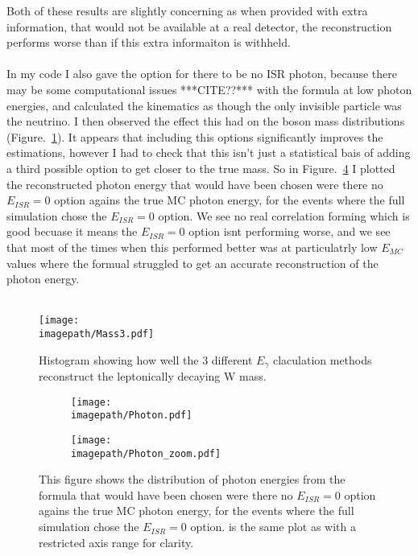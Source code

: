  Both of these results are slightly concerning as when provided with extra information, that would not be available at a real detector, the reconstruction performs worse than if this extra informaiton is withheld.
\\\\
 In my code I also gave the option for there to be no ISR photon, because there may be some computational issues ***CITE??*** with the formula at low photon energies, and calculated the kinematics as though the only invisible particle was the neutrino. I then observed the effect this had on the boson mass distributions (Figure.~\ref{FIG:STUFF}). It appears that including this options significantly improves the estimations, however I had to check that this isn't just a statistical bais of adding a third possible option to get closer to the true mass. So in Figure.~\ref{FIG:Photon} I plotted the reconstructed photon energy that would have been chosen were there no ${E}_{ISR}=0$ option agains the true MC photon energy, for the events where the full simulation chose the ${E}_{ISR}=0$ option. We see no real correlation forming which is good becuase it means the ${E}_{ISR}=0$ option isnt performing worse, and we see that most of the times when this performed better was at particulatrly low ${E}_{MC}$ values where the formual struggled to get an accurate reconstruction of the photon energy.
 \\\\
 \begin{figure}
   \centering
   \texttt{[image: \\imagepath/Mass3.pdf]}
   \caption{
   Histogram showing how well the 3 different ${E}_{\gamma}$ claculation methods reconstruct the leptonically decaying W mass.
   }
   \label{FIG:STUFF}
 \end{figure}
\begin{figure}
  \centering
  \begin{subfigure}[t]{0.45\textwidth}
    \centering
    \texttt{[image: \\imagepath/Photon.pdf]}
    \caption{}
    \label{SUBFIG:Photon_full}
  \end{subfigure}
  \begin{subfigure}[t]{0.45\textwidth}
    \centering
    \texttt{[image: \\imagepath/Photon\_zoom.pdf]}
    \caption{}
    \label{SUBFIG:Photon_zoom}
  \end{subfigure}
  \caption{
    This figure shows the distribution of photon energies from the formula that would have been chosen were there no ${E}_{ISR}=0$ option agains the true MC photon energy, for the events where the full simulation chose the ${E}_{ISR}=0$ option.  is the same plot as  with a restricted axis range for clarity.
  }
  \label{FIG:Photon}
\end{figure}

